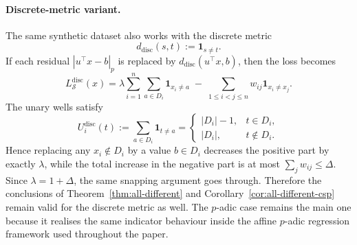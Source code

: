 \documentclass[11pt]{article}
\begin{document}
\paragraph{Discrete-metric variant.}
The same synthetic dataset also works with the discrete metric
\[
d_{\mathrm{disc}}(s,t):=\mathbf 1_{s\neq t}.
\]
If each residual \(|u^\top x-b|_p\) is replaced by \(d_{\mathrm{disc}}(u^\top x,b)\), then the loss becomes
\[
L_{\mathcal S}^{\mathrm{disc}}(x)
=
\lambda\sum_{i=1}^n\sum_{a\in D_i}\mathbf 1_{x_i\neq a}
\;-\;
\sum_{1\le i<j\le n} w_{ij}\mathbf 1_{x_i\neq x_j}.
\]
The unary wells satisfy
\[
U_i^{\mathrm{disc}}(t):=\sum_{a\in D_i}\mathbf 1_{t\neq a}
=
\begin{cases}
|D_i|-1, & t\in D_i,\\
|D_i|, & t\notin D_i.
\end{cases}
\]
Hence replacing any \(x_i\notin D_i\) by a value \(b\in D_i\) decreases the positive part by exactly \(\lambda\), while the total increase in the negative part is at most \(\sum_j w_{ij}\le \Delta\). Since \(\lambda=1+\Delta\), the same snapping argument goes through. Therefore the conclusions of Theorem~\ref{thm:all-different} and Corollary~\ref{cor:all-different-csp} remain valid for the discrete metric as well. The \(p\)-adic case remains the main one because it realises the same indicator behaviour inside the affine \(p\)-adic regression framework used throughout the paper.
\end{document}
